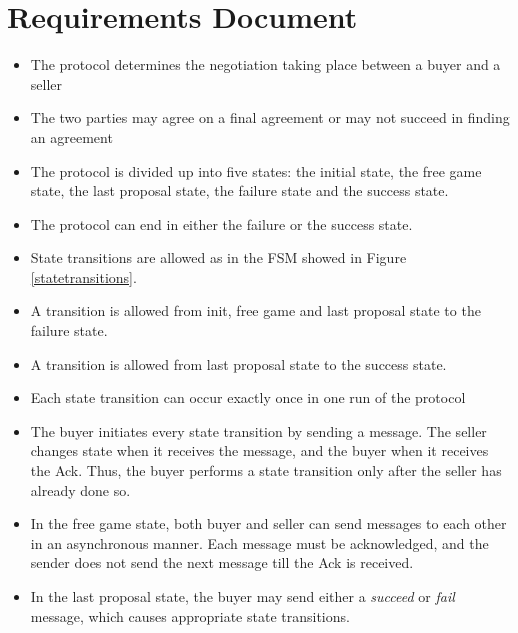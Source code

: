 \section{Requirements Document}
\begin{itemize}
\item The protocol determines the negotiation taking place between a buyer and a seller
\item The two parties may agree on a final agreement or may not succeed in finding an agreement
\item The protocol is divided up into five states: the initial state, the free game state, the last proposal state, the failure state and the success state.
\item The protocol can end in either the failure or the success state.
\item State transitions are allowed as in the FSM showed in Figure \ref{statetransitions}.
\item A transition is allowed from init, free game and last proposal state to the failure state. 
\item A transition is allowed from last proposal state to the success state.
\item Each state transition can occur exactly once in one run of the protocol
\item The buyer initiates every state transition by sending a message. The seller changes state when it receives the message, and the buyer when it receives the Ack. Thus, the buyer performs a state transition only after the seller has already done so.
\item In the free game state, both buyer and seller can send messages to each other in an asynchronous manner. Each message must be acknowledged, and the sender does not send the next message till the Ack is received.
\item In the last proposal state, the buyer may send either a \emph{succeed} or \emph{fail} message, which causes appropriate state transitions.
\end{itemize}
